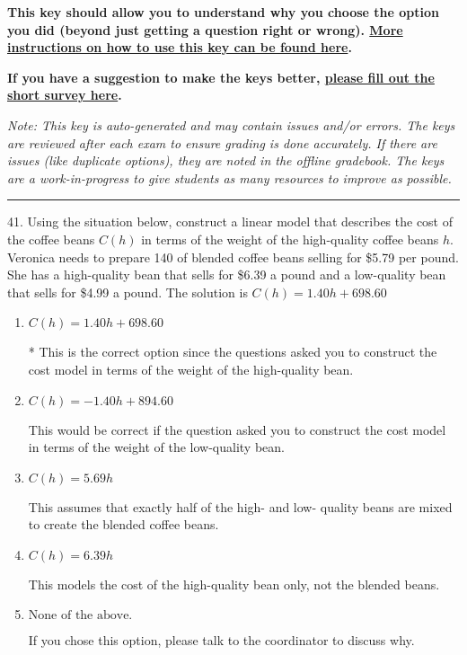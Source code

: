 \documentclass{extbook}[14pt]
\begin{document}
\textbf{This key should allow you to understand why you choose the option you did (beyond just getting a question right or wrong). \href{https://xronos.clas.ufl.edu/mac1105spring2020/courseDescriptionAndMisc/Exams/LearningFromResults}{More instructions on how to use this key can be found here}.}

\textbf{If you have a suggestion to make the keys better, \href{https://forms.gle/CZkbZmPbC9XALEE88}{please fill out the short survey here}.}

\textit{Note: This key is auto-generated and may contain issues and/or errors. The keys are reviewed after each exam to ensure grading is done accurately. If there are issues (like duplicate options), they are noted in the offline gradebook. The keys are a work-in-progress to give students as many resources to improve as possible.}

\rule{\textwidth}{0.4pt}

41. Using the situation below, construct a linear model that describes the cost of the coffee beans $C(h)$ in terms of the weight of the high-quality coffee beans $h$.
Veronica needs to prepare 140 of blended coffee beans selling for \$5.79 per pound. She has a high-quality bean that sells for \$6.39 a pound and a low-quality bean that sells for \$4.99 a pound. 
The solution is $ C(h) = 1.40 h + 698.60 $ 

\begin{enumerate}[label=\Alph*.] 
\item $ C(h) = 1.40 h + 698.60 $ 

 * This is the correct option since the questions asked you to construct the cost model in terms of the weight of the high-quality bean. 
\item $ C(h) = -1.40 h + 894.60 $ 

 This would be correct if the question asked you to construct the cost model in terms of the weight of the low-quality bean. 
\item $ C(h) = 5.69 h $ 

 This assumes that exactly half of the high- and low- quality beans are mixed to create the blended coffee beans. 
\item $ C(h) = 6.39 h $ 

 This models the cost of the high-quality bean only, not the blended beans. 
\item $ \text{None of the above.} $ 

 If you chose this option, please talk to the coordinator to discuss why. 
\end{enumerate} 
 
\end{document}
